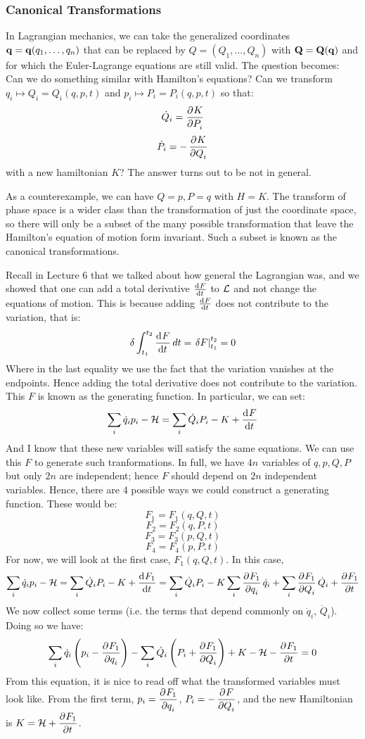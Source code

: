 \subsubsection{Canonical Transformations}
In Lagrangian mechanics, we can take the generalized coordinates $\mathbf{q} = \mathbf{q}(q_1, \ldots, q_n)$ that can be replaced by $Q = (Q_1, \ldots, Q_n)$ with $\mathbf{Q} = \mathbf{Q}(\mathbf{q})$ and for which the Euler-Lagrange equations are still valid. The question becomes: Can we do something similar with Hamilton's equations? Can we transform $q_i \mapsto Q_i = Q_i(q, p, t)$ and $p_i \mapsto P_i = P_i(q, p, t)$ so that:
\[\dot{Q}_i = \dpd{K}{P_i}\]
\[\dot{P}_i = -\dpd{K}{Q_i}\]
with a new hamiltonian $K$? The answer turns out to be not in general.

\noindent As a counterexample, we can have $Q = p, P = q$ with $H = K$. The transform of phase space is a wider class than the transformation of just the coordinate space, so there will only be a subset of the many possible transformation that leave the Hamilton's equation of motion form invariant. Such a subset is known as the canonical transformations. 

\noindent Recall in Lecture 6 that we talked about how general the Lagrangian was, and we showed that one can add a total derivative $\od{F}{t}$ to $\mathcal{L}$ and not change the equations of motion. This is because adding $\od{F}{t}$ does not contribute to the variation, that is:
\[\delta \int_{t_1}^{t_2} \dod{F}{t}dt = \left. \delta F\right|_{t_1}^{t_2} = 0\]
Where in the last equality we use the fact that the variation vanishes at the endpoints. Hence adding the total derivative does not contribute to the variation. This $F$ is known as the generating function. In particular, we can set:
\[\sum_i \dot{q}_i p_i - \HH = \sum_i\dot{Q}_iP_i - K + \dod{F}{t}\]
And I know that these new variables will satisfy the same equations. We can use this $F$ to generate such tranformations. In full, we have $4n$ variables of $q, p, Q, P$ but only $2n$ are independent; hence $F$ should depend on $2n$ independent variables. Hence, there are $4$ possible ways we could construct a generating function. These would be:
\[F_1 = F_1(q, Q, t)\]
\[F_2 = F_2(q, P, t)\]
\[F_3 = F_3(p, Q, t)\]
\[F_4 = F_4(p, P, t)\]
For now, we will look at the first case, $F_1(q, Q, t)$. In this case, 
\[\sum_i \dot{q}_i p_i - \HH = \sum_i \dot{Q}_i P_i - K + \dod{F_1}{t} = \sum_{i}\dot{Q}_iP_i - K \sum_i\dpd{F_1}{q_i}\dot{q}_i + \sum_i \dpd{F_1}{Q_i}\dot{Q}_i + \dpd{F_1}{t}\]
We now collect some terms (i.e. the terms that depend commonly on $\dot{q}_i$, $\dot{Q}_i$). Doing so we have:
\[\sum_i \dot{q}_i\left(p_i - \dpd{F_1}{q_i}\right) - \sum_i\dot{Q}_i\left(P_i + \dpd{F_1}{Q_i}\right) + K - \HH - \dpd{F_1}{t} = 0\]
From this equation, it is nice to read off what the transformed variables must look like. From the first term, $p_i = \dpd{F_1}{q_i}$, $P_i = -\dpd{F}{Q_i}$, and the new Hamiltonian is $K = \HH + \dpd{F_1}{t}$.

